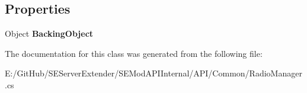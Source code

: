 \subsection*{Properties}
\begin{DoxyCompactItemize}
\item 
\hypertarget{class_s_e_mod_a_p_i_internal_1_1_a_p_i_1_1_common_1_1_radio_manager_network_manager_a33cb953151a269963339f92736ed1c92}{}Object {\bfseries Backing\+Object}\label{class_s_e_mod_a_p_i_internal_1_1_a_p_i_1_1_common_1_1_radio_manager_network_manager_a33cb953151a269963339f92736ed1c92}

\end{DoxyCompactItemize}


The documentation for this class was generated from the following file\+:\begin{DoxyCompactItemize}
\item 
E\+:/\+Git\+Hub/\+S\+E\+Server\+Extender/\+S\+E\+Mod\+A\+P\+I\+Internal/\+A\+P\+I/\+Common/Radio\+Manager.\+cs\end{DoxyCompactItemize}
